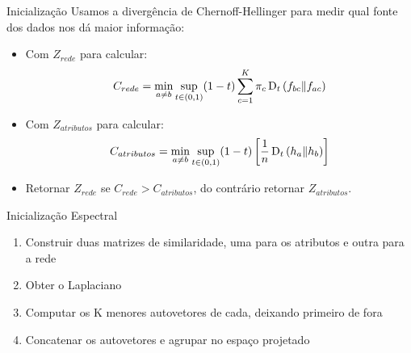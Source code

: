 \documentclass[aspectratio=169]{beamer}
\begin{document}

\begin{frame}{Inicialização}
\hspace*{5px}
    Usamos a divergência de Chernoff-Hellinger para medir qual fonte dos dados nos dá maior informação:
        \begin{itemize}
	 \item Com $Z_{rede}$ para calcular:  
	 \begin{align*}
		     C_{rede}=\min\limits_{a\ne b} \sup\limits_{t \in (0,1)} (1-t) \sum\limits_{c=1}^K \pi_c \operatorname{D}_t \left( f_{b c} \| f_{ac} \right)
		\end{align*}
	\item Com $Z_{atributos}$ para calcular:
	\begin{align*}
	 C_{atributos} = \min\limits_{a\ne b} \sup\limits_{t \in (0,1)} (1-t) \left[ \frac1n \operatorname{D}_t \left( h_a \| h_b \right)\right]    
	 \end{align*}
	 \item Retornar $Z_{rede}$ se $C_{rede} > C_{atributos}$, do contrário retornar $Z_{atributos}$. 
	\end{itemize}
\end{frame}

\begin{frame}{Inicialização Espectral}
    \begin{enumerate}
	        \item Construir duas matrizes de similaridade, uma para os atributos e outra para a rede
	        \item Obter o Laplaciano
	        \item Computar os K menores autovetores de cada, deixando primeiro de fora
	        \item Concatenar os autovetores e agrupar no espaço projetado
	    \end{enumerate}
\end{frame}
\end{document}
